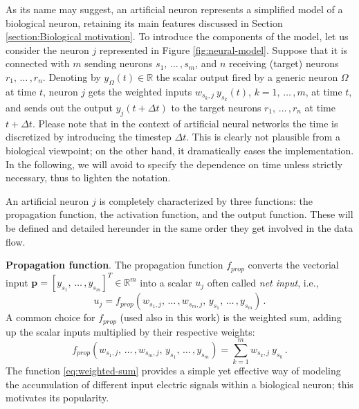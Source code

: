 \documentclass[12pt, a4paper, twoside, openright]{report}
\numberwithin{equation}{chapter}
\theoremstyle{theorem}
\theoremstyle{definition}
\theoremstyle{remark}
\theoremstyle{proposition}
\numberwithin{figure}{chapter}
\begin{document}
		As its name may suggest, an artificial neuron represents a simplified model of a biological neuron, retaining its main features discussed in Section \ref{section:Biological motivation}. To introduce the components of the model, let us consider the neuron $j$ represented in Figure \ref{fig:neural-model}. Suppose that it is connected with $m$ sending neurons $s_1, \, \ldots \, , s_m$, and $n$ receiving (target) neurons $r_1, \, \ldots \, , r_n$. Denoting by $y_{\Omega}(t) \in \mathbb{R}$ the scalar output fired by a generic neuron $\Omega$ at time $t$, neuron $j$ gets the weighted inputs $w_{s_k,j} ~ y_{s_k}(t)$, $k = 1, \, \ldots \, , m$, at time $t$, and sends out the output $y_j(t + \Delta t)$ to the target neurons $r_1, \, \ldots \, , r_n$ at time $t + \Delta t$. Please note that in the context of artificial neural networks the time is discretized by introducing the timestep $\Delta t$. This is clearly not plausible from a biological viewpoint; on the other hand, it dramatically eases the implementation. In the following, we will avoid to specify the dependence on time unless strictly necessary, thus to lighten the notation.
		
		An artificial neuron $j$ is completely characterized by three functions: the propagation function, the activation function, and the output function. These will be defined and detailed hereunder in the same order they get involved in the data flow. 
		
		\vspace*{0.3cm}
		
		\noindent \textbf{Propagation function}. The propagation function $f_{prop}$ converts the vectorial input $\boldsymbol{p} = [y_{s_1}, \, \ldots \, , y_{s_m}]^T \in \mathbb{R}^m$ into a scalar $u_{j}$ often called \emph{net input}, i.e.,
		\begin{equation}
			\label{eq:propagation-function}
			u_{j} = f_{prop}(w_{s_1,j}, \, \ldots \, , w_{s_m,j}, \, y_{s_1}, \, \ldots \, , y_{s_m}) \, .
		\end{equation}
		A common choice for $f_{prop}$ (used also in this work) is the weighted sum, adding up the scalar inputs multiplied by their respective weights:
		\begin{equation}
			\label{eq:weighted-sum}
			f_{prop}(w_{s_1,j}, \, \ldots \, , w_{s_m,j}, \, y_{s_1}, \, \ldots \, , y_{s_m}) = \sum_{k = 1}^m w_{s_k,j} ~ y_{s_k} \, .
		\end{equation} 
		The function \eqref{eq:weighted-sum} provides a simple yet effective way of modeling the accumulation of different input electric signals within a biological neuron; this motivates its popularity.
		
\end{document}
